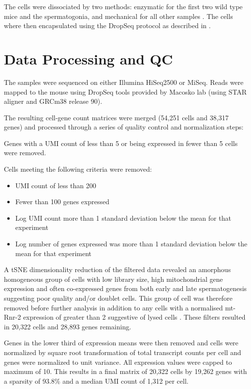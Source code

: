 The cells were dissociated by two methods: enzymatic for the first two wild type mice and the spermatogonia, and mechanical for all other samples \cite{Lima2017Standardized,Jung2019Unified}. The cells where then encapsulated using the DropSeq protocol \cite{Macosko2015Highly} as described in \cite{Jung2019Unified}.


\section{Data Processing and QC}

The samples were sequenced on either Illumina HiSeq2500 or MiSeq. Reads were mapped to the mouse using DropSeq tools provided by Macosko lab (using STAR aligner and GRCm38 release 90).

The resulting cell-gene count matrices were merged (54,251 cells and 38,317 genes) and processed through a series of quality control and normalization steps:

Genes with a UMI count of less than 5 or being expressed in fewer than 5 cells were removed.

Cells meeting the following criteria were removed:
\begin{itemize}
\item UMI count of less than 200
\item Fewer than 100 genes expressed
\item Log UMI count more than 1 standard deviation below the mean for that experiment
\item Log number of genes expressed was more than 1 standard deviation below the mean for that experiment
\end{itemize}

A tSNE dimensionality reduction of the filtered data revealed an amorphous homogeneous group of cells with low library size, high mitochondrial gene expression and often co-expressed genes from both early and late spermatogenesis suggesting poor quality and/or doublet cells. This group of cell was therefore removed before further analysis in addition to any cells with a normalised mt-Rnr-2 expression of greater than 2 suggestive of lysed cells \cite{Ilicic2016Classification}. These filters resulted in 20,322 cells and 28,893 genes remaining.

Genes in the lower third of expression means were then removed and cells were normalized by square root transformation of total transcript counts per cell and genes were normalized to unit variance. All expression values were capped to maximum of 10. This results in a final matrix of 20,322 cells by 19,262 genes with a sparsity of 93.8\% and a median UMI count of 1,312 per cell.

